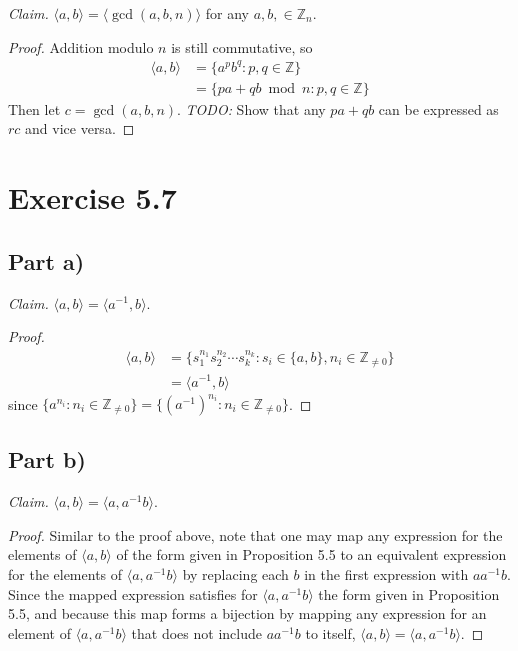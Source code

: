 \documentclass{abrice}
\newcommand{\Z}{\mathbb{Z}}
\begin{document}
\textit{Claim.} $\langle a, b \rangle = \langle \gcd(a, b, n) \rangle$ for any
$a, b, \in \Z_n$.

\begin{proof}
  Addition modulo $n$ is still commutative, so
  \begin{align*}
    \langle a, b \rangle
    & = \{ a^p b^q : p, q \in \Z \} \\
    & = \{ pa + qb \bmod n : p, q \in \Z\}
  \end{align*}
  Then let $c = \gcd(a, b, n)$. \emph{TODO:} Show that any $pa + qb$ can be
  expressed as $rc$ and vice versa.
\end{proof}

\section{Exercise 5.7}

\subsection{Part a)}

\emph{Claim.} $\langle a, b \rangle = \langle a^{-1}, b \rangle$.

\begin{proof}
  \begin{align*}
    \langle a, b \rangle
    & = \{ s_1^{n_1}s_2^{n_2} \cdots s_k^{n_k} :
    s_i \in \{a, b\}, n_i \in \Z_{\neq 0} \} \\
    & = \langle a^{-1}, b \rangle
  \end{align*}
  since $\{ a^{n_i} : n_i \in \Z_{\neq 0} \} = \{ {(a^{-1})}^{n_i} : n_i \in
  \Z_{\neq 0} \}$.
\end{proof}

\subsection{Part b)}

\emph{Claim.} $\langle a, b \rangle = \langle a, a^{-1} b \rangle$.

\begin{proof}
  Similar to the proof above, note that one may map any expression for the
  elements of $\langle a, b \rangle$ of the form given in Proposition 5.5 to an
  equivalent expression for the elements of $\langle a, a^{-1} b \rangle$ by
  replacing each $b$ in the first expression with $a a^{-1} b$. Since the mapped
  expression satisfies for $\langle a, a^{-1} b \rangle$ the form given in
  Proposition 5.5, and because this map forms a bijection by mapping any
  expression for an element of $\langle a, a^{-1} b \rangle$ that does not
  include $a a^{-1} b$ to itself, $\langle a, b \rangle = \langle a, a^{-1} b
  \rangle$.
\end{proof}
\end{document}
